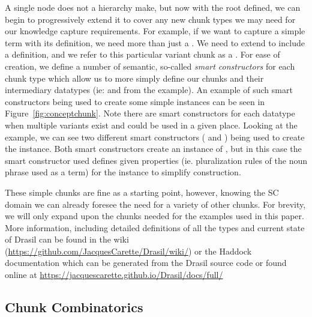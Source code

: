 A single node does not a hierarchy make, but now with the root 
 defined, we can begin to progressively extend it to cover 
any new chunk types we may need for our knowledge capture requirements. For 
example, if we want to capture a simple term with its definition, we need more 
than just a . We need to extend  to include 
a definition, and we refer to this particular variant chunk as a 
. For ease of creation, we define a number of semantic, 
so-called \emph{smart constructors} for each chunk type which allow us to more 
simply define our chunks and their intermediary datatypes (ie:  and 
 from the  example). An example of such smart 
constructors being used to create some simple  instances 
can be seen in Figure~\ref{fig:conceptchunk}. Note there are smart constructors 
for each datatype when multiple variants exist and could be used in a given 
place. Looking at the  example, we can see two different 
smart constructors ( and ) being used to create the 
 instance. Both smart constructors create an instance of , 
but in this case the smart constructor used defines given properties (ie. 
pluralization rules of the noun phrase used as a term) for the instance to 
simplify construction.


These simple chunks are fine as a starting point, however, knowing the SC 
domain we can already foresee the need for a variety of other chunks. For 
brevity, we will only expand upon the chunks needed for the examples used in 
this paper. More information, including detailed definitions of all the types 
and current state of Drasil can be found in the wiki 
(\href{https://github.com/JacquesCarette/Drasil/wiki/}
{https://github.com/JacquesCarette/Drasil/wiki/}) or the Haddock documentation 
which can be generated from the Drasil source code or found online at 
\href{https://jacquescarette.github.io/Drasil/docs/full/}
{https://jacquescarette.github.io/Drasil/docs/full/}

\subsection{Chunk Combinatorics}
\label{sec:chunky}


